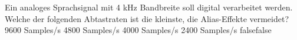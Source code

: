     {Ein analoges Sprachsignal mit 4 kHz Bandbreite soll digital verarbeitet werden. Welche der folgenden Abtastraten ist die kleinste, die Alias-Effekte vermeidet?}
    {9600 Samples/s}
    {4800 Samples/s}
    {4000 Samples/s}
    {2400 Samples/s}
    {false}{false}